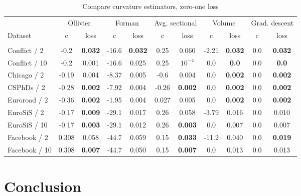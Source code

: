 \documentclass{article} %
\begin{document}
\begin{table}[t]
\caption{Compare curvature estimators, zero-one loss}
\label{tab:compare_zero_one}
\begin{center}
\begin{tabular}{lcccccccc|cc}
&
\multicolumn{2}{c}{Ollivier} &
\multicolumn{2}{c}{Forman} &
\multicolumn{2}{c}{Avg. sectional} &
\multicolumn{2}{c}{Volume} &
\multicolumn{2}{|c}{Grad. descent} 
\\
Dataset & c & loss  & c & loss  & c & loss & c & loss & c & loss  
\\
\hline \\
Conflict / 2 &
-0.2 & \textbf{0.032} &
-16.6 &\textbf{0.032} &
0.25 & 0.060 &
-2.21 & \textbf{0.032} &
0.0 & \textbf{0.032} \\
Conflict / 10 &
-0.2 & 0.001 &
-16.6 &	0.025 &
0.25 & $10^{-4}$ &
0.0 & \textbf{0.0} &
0.0 & \textbf{0.0}  \\
Chicago / 2 &
-0.19 & 0.004 & 
-8.37 & 0.005 & 
-0.6 & 0.004 & 
0.0 & \textbf{0.002} &
0.0 & \textbf{0.002}  \\
CSPhDs / 2 &
-0.28 &	\textbf{0.002} &
-7.92 &	0.004 &
-0.26 & \textbf{0.002} &
0.0 & \textbf{0.002} &
0.0 & \textbf{0.002}  \\
Euroroad / 2 &
-0.36 &	\textbf{0.002} &
-1.95 &	0.004 &
0.027 &	0.005 &
0.0 & \textbf{0.002} &
0.0 & \textbf{0.002} \\
EuroSiS / 2 &
-0.17 & \textbf{0.009} & 
-29.1 & 0.017 & 
0.26 & 0.058 & 
-3.79 & 0.016 &
0.0 & 0.010  \\
EuroSiS / 10 &
-0.17 & \textbf{0.003} & 
-29.1 & 0.012 & 
0.26 & \textbf{0.003} & 
0.0 & 0.007 &
0.0 & 0.007\\
Facebook / 2 &
0.308 & 0.058 & 
-44.7 & 0.059 & 
0.15 & \textbf{0.033} & 
-11.2 & 0.040 &
0.0 & \textbf{0.019} \\
Facebook / 10 &
0.308 & \textbf{0.007} & 
-44.7 & 0.050 & 
0.15 & \textbf{0.007} & 
0.0 & 0.013 &
0.0 & 0.013 \\
\end{tabular}
\end{center}
\end{table}

\section{Conclusion}
\end{document}
